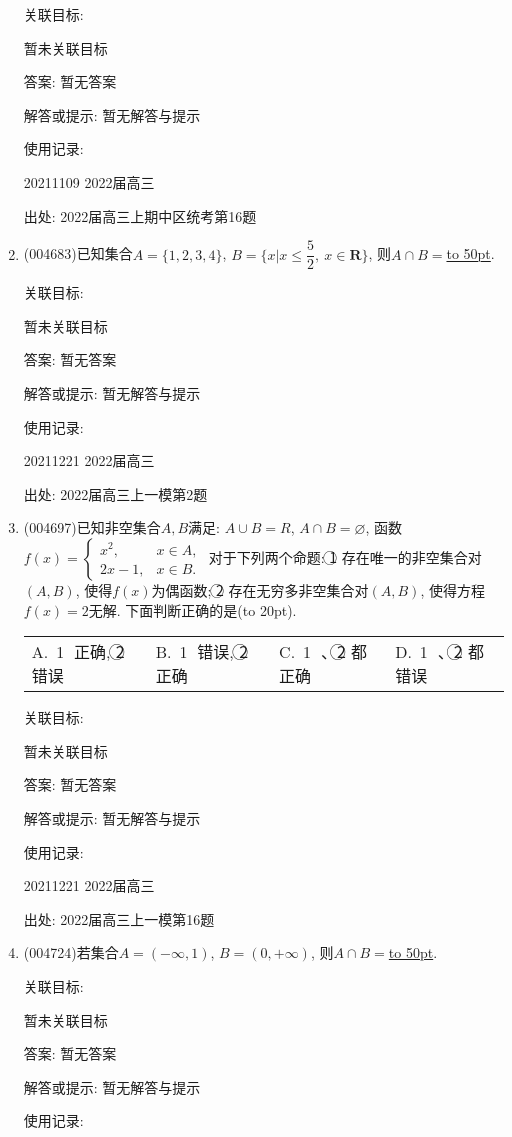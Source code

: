 \documentclass[10pt,a4paper]{article}
\newcommand{\blank}[1]{\underline{\hbox to #1pt{}}}
\newcommand{\bracket}[1]{(\hbox to #1pt{})}
\newcommand{\fourch}[4]{\par\begin{tabular}{p{.23\textwidth}p{.23\textwidth}p{.23\textwidth}p{.23\textwidth}}
A.~#1 &B.~#2& C.~#3& D.~#4
\end{tabular}}
\begin{document}
\begin{enumerate}[1.]
关联目标:

暂未关联目标

答案: 暂无答案

解答或提示: 暂无解答与提示

使用记录:

20211109	2022届高三	


出处: 2022届高三上期中区统考第16题
\item { (004683)}已知集合$A=\{1,2,3,4\}$, $B=\{x|x\le \dfrac 52, \ x\in \mathbf{R}\}$, 则$A\cap B=$\blank{50}.


关联目标:

暂未关联目标

答案: 暂无答案

解答或提示: 暂无解答与提示

使用记录:

20211221	2022届高三	


出处: 2022届高三上一模第2题
\item { (004697)}已知非空集合$A,B$满足: $A\cup B=R$, $A\cap B=\varnothing$, 函数$f(x)=\begin{cases}
x^2, &  x\in A,  \\ 2x-1, &  x\in B.  \end{cases}$ 对于下列两个命题: \textcircled{1} 存在唯一的非空集合对$(A,B)$, 使得$f(x)$为偶函数; \textcircled{2} 存在无穷多非空集合对$(A,B)$, 使得方程$f(x)=2$无解. 下面判断正确的是\bracket{20}.
\fourch{\textcircled{1} 正确, \textcircled{2} 错误}{\textcircled{1} 错误, \textcircled{2} 正确}{\textcircled{1} 、\textcircled{2} 都正确}{\textcircled{1} 、\textcircled{2} 都错误}


关联目标:

暂未关联目标

答案: 暂无答案

解答或提示: 暂无解答与提示

使用记录:

20211221	2022届高三	


出处: 2022届高三上一模第16题
\item { (004724)}若集合$A=(-\infty ,1)$, $B=(0,+\infty)$, 则$A\cap B=$\blank{50}.


关联目标:

暂未关联目标

答案: 暂无答案

解答或提示: 暂无解答与提示

使用记录:


\end{enumerate}
\end{document}
